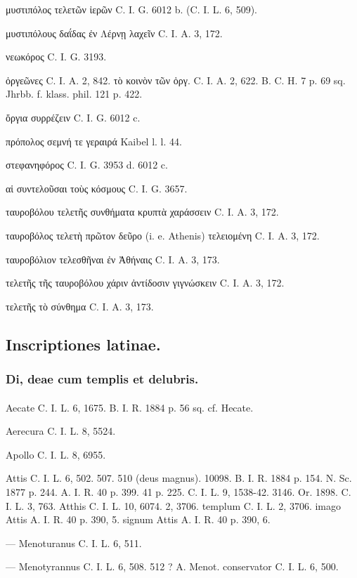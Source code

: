 \documentclass[a4paper, 11pt, oneside, polutonikogreek, german]{article}
\begin{document}
μυστιπόλος τελετῶν ἱερῶν C. I. G. 6012 b. (C. I. L. 6, 509).

μυστιπόλους δαΐδας ἐν Λέρνῃ λαχεῖν C. I. A. 3, 172.

νεωκόρος C. I. G. 3193.

ὀργεῶνες C. I. A. 2, 842. τὸ κοινὸν τῶν ὀργ. C. I. A. 2, 622. B. C. H. 7 p. 69 sq. Jhrbb. f. klass. phil. 121 p. 422.

ὄργια συρρέζειν C. I. G. 6012 c.

πρόπολος σεμνή τε γεραιρά Kaibel l. l. 44.

στεφανηφόρος C. I. G. 3953 d. 6012 c.

αἱ συντελοῦσαι τοὺς κόσμους C. I. G. 3657.

ταυροβόλου τελετῆς συνθήματα κρυπτὰ χαράσσειν C. I. A. 3, 172.

ταυροβόλος τελετὴ πρῶτον δεῦρο (i. e. Athenis) τελειομένη C. I. A. 3, 172.

ταυροβόλιον τελεσθῆναι ἐν Ἀθήναις C. I. A. 3, 173.

τελετῆς τῆς ταυροβόλου χάριν ἀντίδοσιν γιγνώσκειν C. I. A. 3, 172.

τελετῆς τὸ σύνθημα C. I. A. 3, 173.

\subsection{Inscriptiones latinae.}
\subsubsection{Di, deae cum templis et delubris.}
\paragraph{}
Aecate C. I. L. 6, 1675. B. I. R. 1884 p. 56 sq. cf. Hecate.

Aerecura C. I. L. 8, 5524.

Apollo C. I. L. 8, 6955.

Attis C. I. L. 6, 502. 507. 510 (deus magnus). 10098. B. I. R. 1884 p. 154. N. Sc. 1877 p. 244. A. I. R. 40 p. 399. 41 p. 225. C. I. L. 9, 1538-42. 3146. Or. 1898. C. I. L. 3, 763. Atthis C. I. L. 10, 6074. 2, 3706. templum C. I. L. 2, 3706. imago Attis A. I. R. 40 p. 390, 5. signum Attis A. I. R. 40 p. 390, 6.

--- Menoturanus C. I. L. 6, 511.

--- Menotyrannus C. I. L. 6, 508. 512 ? A. Menot. conservator C. I. L. 6, 500.
\end{document}
